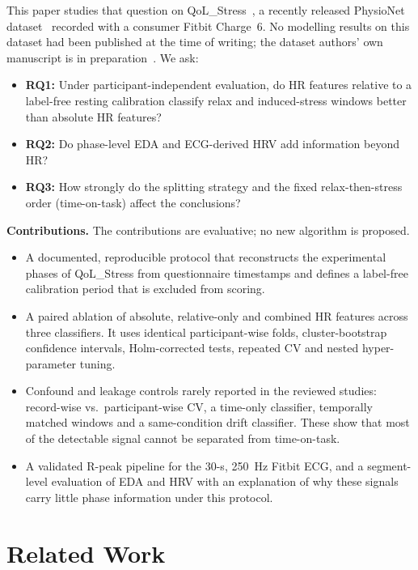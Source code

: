 \documentclass[conference]{IEEEtran}
\begin{document}
This paper studies that question on QoL\_Stress~\cite{calvo2026qolstress}, a recently released PhysioNet dataset~\cite{pollard2026physionet} recorded with a consumer Fitbit Charge~6. No modelling results on this dataset had been published at the time of writing; the dataset authors' own manuscript is in preparation~\cite{calvo2026qolstress}. We ask:
\begin{itemize}
\item \textbf{RQ1:} Under participant-independent evaluation, do HR features relative to a label-free resting calibration classify relax and induced-stress windows better than absolute HR features?
\item \textbf{RQ2:} Do phase-level EDA and ECG-derived HRV add information beyond HR?
\item \textbf{RQ3:} How strongly do the splitting strategy and the fixed relax-then-stress order (time-on-task) affect the conclusions?
\end{itemize}

\textbf{Contributions.} The contributions are evaluative; no new algorithm is proposed.
\begin{itemize}
\item A documented, reproducible protocol that reconstructs the experimental phases of QoL\_Stress from questionnaire timestamps and defines a label-free calibration period that is excluded from scoring.
\item A paired ablation of absolute, relative-only and combined HR features across three classifiers. It uses identical participant-wise folds, cluster-bootstrap confidence intervals, Holm-corrected tests, repeated CV and nested hyper-parameter tuning.
\item Confound and leakage controls rarely reported in the reviewed studies: record-wise vs.\ participant-wise CV, a time-only classifier, temporally matched windows and a same-condition drift classifier. These show that most of the detectable signal cannot be separated from time-on-task.
\item A validated R-peak pipeline for the 30-s, 250~Hz Fitbit ECG, and a segment-level evaluation of EDA and HRV with an explanation of why these signals carry little phase information under this protocol.
\end{itemize}

\section{Related Work}
\end{document}
